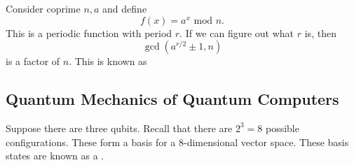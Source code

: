 \documentclass{article}
\numberwithin{equation}{section}
\begin{document}
Consider coprime $n,a$ and define 
\begin{equation}
    f(x) = a^x \text{ mod } n.
\end{equation} 
This is a periodic function with period $r$. If we can figure out what $r$ is, then
\begin{equation}
    \gcd(a^{r/2} \pm 1, n)
\end{equation}
is a factor of $n$. This is known as 
\subsection{Quantum Mechanics of Quantum Computers}
Suppose there are three qubits. Recall that there are $2^3=8$ possible configurations. These form a basis for a $8$-dimensional vector space. These basis states are known as a .
\end{document}
